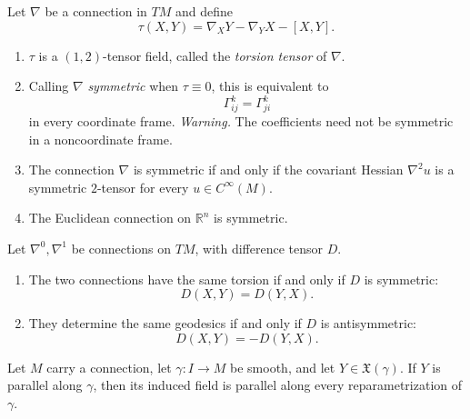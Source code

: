 \begin{proposition}
\label{prop:torsion-tensor}
\leanok
Let $\nabla$ be a connection in $TM$ and define
\[
\tau(X,Y)=\nabla_XY-\nabla_YX-[X,Y].
\]
\begin{enumerate}
\item[(a)] $\tau$ is a $(1,2)$-tensor field, called the
\emph{torsion tensor} of $\nabla$.
\item[(b)] Calling $\nabla$ \emph{symmetric} when $\tau\equiv0$, this is
equivalent to
\[
\Gamma^k_{ij}=\Gamma^k_{ji}
\]
in every coordinate frame. \emph{Warning.} The coefficients need not be symmetric
in a noncoordinate frame.
\item[(c)] The connection $\nabla$ is symmetric if and only if the covariant Hessian
$\nabla^2u$ is a symmetric $2$-tensor for every $u\in C^\infty(M)$.
\item[(d)] The Euclidean connection on $\mathbb R^n$ is symmetric.
\end{enumerate}
\end{proposition}

\begin{proposition}
\label{prop:connections-difference-tensor}
\leanok
Let $\nabla^0,\nabla^1$ be connections on $TM$, with difference tensor $D$.
\begin{enumerate}
\item[(a)] The two connections have the same torsion if and only if
$D$ is symmetric:
\[
D(X,Y)=D(Y,X).
\]
\item[(b)] They determine the same geodesics if and only if $D$ is
antisymmetric:
\[
D(X,Y)=-D(Y,X).
\]
\end{enumerate}
\end{proposition}

\begin{proposition}
\label{prop:parallel-reparametrization}
\leanok
Let $M$ carry a connection, let $\gamma\colon I\to M$ be smooth, and let
$Y\in\mathfrak X(\gamma)$. If $Y$ is parallel along $\gamma$, then its induced
field is parallel along every reparametrization of $\gamma$.
\end{proposition}
